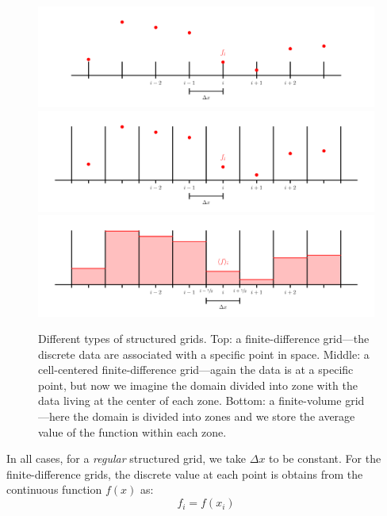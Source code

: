 \begin{figure}[t]
\centering
\includegraphics[width=\linewidth]{fd_grid} \\
\includegraphics[width=\linewidth]{ccfd_grid} \\
\includegraphics[width=\linewidth]{fv_grid}
\caption[Types of structured grids.]{\label{fig:grids} Different types of structured grids.  Top:
  a finite-difference grid---the discrete data are associated with a
  specific point in space.  Middle: a cell-centered finite-difference
  grid---again the data is at a specific point, but now we imagine the
  domain divided into zone with the data living at the center of each
  zone.  Bottom: a finite-volume grid---here the domain is divided
  into zones and we store the average value of the function within
  each zone.}
\end{figure}

In all cases, for a {\em regular} structured grid, we take $\Delta x$
to be constant.  For the finite-difference grids, the discrete value at
each point is obtains from the continuous function $f(x)$ as:
\begin{equation}
f_i = f(x_i)
\end{equation}


